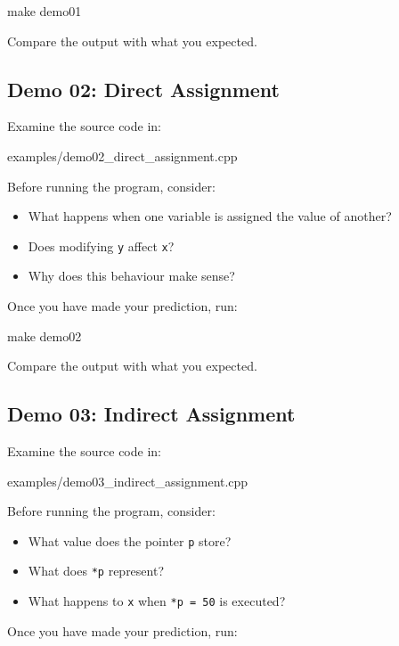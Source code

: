 \documentclass{csc2059practical}
\begin{document}
\begin{bashcode}
make demo01
\end{bashcode}

Compare the output with what you expected.

\subsection*{Demo 02: Direct Assignment}

Examine the source code in:

\begin{terminal}
examples/demo02_direct_assignment.cpp
\end{terminal}

Before running the program, consider:
\begin{itemize}
  \item What happens when one variable is assigned the value of another?
  \item Does modifying \texttt{y} affect \texttt{x}?
  \item Why does this behaviour make sense?
\end{itemize}

Once you have made your prediction, run:

\begin{bashcode}
make demo02
\end{bashcode}

Compare the output with what you expected.

\subsection*{Demo 03: Indirect Assignment}

Examine the source code in:

\begin{terminal}
examples/demo03_indirect_assignment.cpp
\end{terminal}

Before running the program, consider:
\begin{itemize}
  \item What value does the pointer \texttt{p} store?
  \item What does \texttt{*p} represent?
  \item What happens to \texttt{x} when \texttt{*p = 50} is executed?
\end{itemize}

Once you have made your prediction, run:
\end{document}
